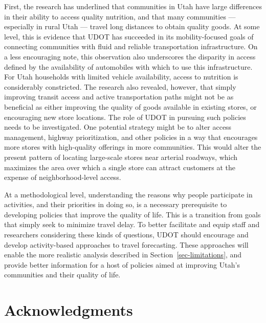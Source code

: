 \documentclass[
  letterpaper,
  DIV=11,
  numbers=noendperiod]{scrreport}
\begin{document}
First, the research has underlined that communities in Utah have large
differences in their ability to access quality nutrition, and that many
communities --- especially in rural Utah --- travel long distances to
obtain quality goods. At some level, this is evidence that UDOT has
succeeded in its mobility-focused goals of connecting communities with
fluid and reliable transportation infrastructure. On a less encouraging
note, this observation also underscores the disparity in access defined
by the availability of automobiles with which to use this
infrastructure. For Utah households with limited vehicle availability,
access to nutrition is considerably constricted. The research also
revealed, however, that simply improving transit access and active
transportation paths might not be as beneficial as either improving the
quality of goods available in existing stores, or encouraging new store
locations. The role of UDOT in pursuing such policies needs to be
investigated. One potential strategy might be to alter access
management, highway prioritization, and other policies in a way that
encourages more stores with high-quality offerings in more communities.
This would alter the present pattern of locating large-scale stores near
arterial roadways, which maximizes the area over which a single store
can attract customers at the expense of neighborhood-level access.

At a methodological level, understanding the reasons why people
participate in activities, and their priorities in doing so, is a
necessary prerequisite to developing policies that improve the quality
of life. This is a transition from goals that simply seek to minimize
travel delay. To better facilitate and equip staff and researchers
considering these kinds of questions, UDOT should encourage and develop
activity-based approaches to travel forecasting. These approaches will
enable the more realistic analysis described in
Section~\ref{sec-limitations}, and provide better information for a host
of policies aimed at improving Utah's communities and their quality of
life.


\hypertarget{acknowledgments}{%
\chapter*{Acknowledgments}\label{acknowledgments}}

\end{document}
